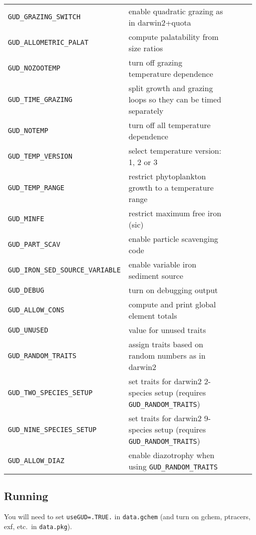 \documentclass[11pt,letterpaper,english]{article}
\begin{document}
{\begin{longtable}[l]{ll>{$}l<{$}l>{$}r<{$}}
  \hline
  \verb|GUD_GRAZING_SWITCH|           & enable quadratic grazing as in darwin2+quota \\
  \verb|GUD_ALLOMETRIC_PALAT|         & compute palatability from size ratios \\
  \verb|GUD_NOZOOTEMP|                & turn off grazing temperature dependence \\
  \verb|GUD_TIME_GRAZING|             & split growth and grazing loops so they can be timed separately \\
  \hline
  \verb|GUD_NOTEMP|                   & turn off all temperature dependence \\
  \verb|GUD_TEMP_VERSION|             & select temperature version: 1, 2 or 3 \\
  \verb|GUD_TEMP_RANGE|               & restrict phytoplankton growth to a temperature range \\
  \hline
  \verb|GUD_MINFE|                    & restrict maximum free iron (sic) \\
  \verb|GUD_PART_SCAV|                & enable particle scavenging code \\
  \verb|GUD_IRON_SED_SOURCE_VARIABLE| & enable variable iron sediment source \\
  \hline
  \verb|GUD_DEBUG|                    & turn on debugging output \\
  \verb|GUD_ALLOW_CONS|               & compute and print global element totals \\
  \verb|GUD_UNUSED|                   & value for unused traits \\
  \hline
  \verb|GUD_RANDOM_TRAITS|            & assign traits based on random numbers as in darwin2 \\
  \verb|GUD_TWO_SPECIES_SETUP|        & set traits for darwin2 2-species setup (requires \verb|GUD_RANDOM_TRAITS|) \\
  \verb|GUD_NINE_SPECIES_SETUP|       & set traits for darwin2 9-species setup (requires \verb|GUD_RANDOM_TRAITS|) \\
  \verb|GUD_ALLOW_DIAZ|               & enable diazotrophy when using \verb|GUD_RANDOM_TRAITS| \\
  \hline
\end{longtable}}



\subsection{Running}

You will need to set \verb|useGUD=.TRUE.| in \verb|data.gchem| (and turn on
gchem, ptracers, exf, etc.\ in \verb|data.pkg|).
\end{document}
